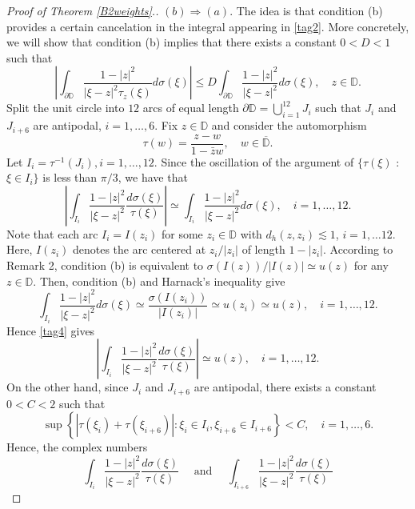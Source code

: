 \documentclass[a4paper,12pt]{article}
\theoremstyle{definition}
\numberwithin{equation}{section}
\newcommand{\D}{\mathbb D}
\begin{document}
\begin{proof}[Proof of Theorem \ref{B2weights}.]
$(b) \Rightarrow(a)$. The idea is that condition (b) provides a certain cancelation in the integral appearing in \eqref{tag2}. More concretely, we will show that condition (b) implies that there exists a constant $0<D<1$ such that
\begin{equation}
    \label{AC1}
    \left|\int_{\partial \D} \frac{1-|z|^{2}}{|\xi-z|^{2} \tau_z (\xi)} d \sigma (\xi)\right| \leq D \int_{\partial \D} \frac{1-|z|^{2}}{|\xi-z|^{2}} d \sigma (\xi), \quad z \in \D  . 
\end{equation}
Split the unit circle into $12$ arcs of equal length $\partial \mathbb{D}=\bigcup_{i=1}^{12} J_{i}$ such that $J_{i}$ and $J_{i+6}$ are antipodal, $i=1, \ldots, 6$. Fix $z \in \mathbb{D}$ and consider the automorphism
$$
\tau (w)=\frac{z-w}{1-\bar{z} w}, \quad  w \in \overline{ \mathbb{D} } . 
$$
Let $I_{i}=\tau^{-1}\left(J_{i}\right), i=1, \ldots, 12$. Since the oscillation of the argument of $\{ \tau(\xi)$ : $\xi \in I_i \}$ is less than $\pi / 3$, we have that 
\begin{equation}
    \label{tag4}
    \left|\int_{I_{i}} \frac{1-|z|^{2}}{|\xi-z|^{2}} \frac{d \sigma(\xi)}{\tau(\xi)}\right| \simeq  \int_{I_{i}} \frac{1-|z|^{2}}{|\xi-z|^{2}} d \sigma ( \xi),\quad  i=1,\ldots , 12. 
\end{equation}
Note that each arc $I_{i} = I(z_i)$ for some $z_{i} \in \D$ with $d_{h}\left(z, z_{i}\right) \lesssim 1$, $i=1, \ldots 12$. Here, $I(z_i)$ denotes the arc centered at $z_i / |z_i|$ of length $1-|z_i|$. According to Remark 2, condition (b) is equivalent to $\sigma (I(z)) / |I(z)| \simeq u(z)$ for any $z \in \D $. Then, condition (b) and Harnack's inequality give 
$$
\int_{I_i} \frac{1-|z|^2}{|\xi - z|^2} d \sigma (\xi) \simeq \frac{\sigma\left(I (z_i)\right)}{| I (z_i)|} \simeq u(z_i) \simeq u(z), \quad i=1,\ldots, 12 .  
$$
Hence \eqref{tag4} gives 
$$
\left|\int_{I_i} \frac{1-|z|^{2}}{|\xi-z|^{2}} \frac{d \sigma(\xi)}{\tau(\xi)}\right| \simeq u (z), \quad i=1, \ldots , 12 .
$$
On the other hand, since $J_{i}$ and $J_{i+6}$ are antipodal, there exists a constant $0<C<2$ such that
$$
\sup \left\{ \left|\tau\left(\xi_{i}\right) + \tau\left(\xi_{i+6}\right)\right|: \xi_{i} \in I_{i}, \xi_{i+6} \in I_{i+6}\right\}<C ,\quad  i=1,\ldots , 6. 
$$
Hence, the complex numbers 
$$
\int_{I_{i}} \frac{1-|z|^{2}}{|\xi-z|^{2}} \frac{d \sigma(\xi)}{\tau(\xi)} \quad  \text { and } \quad  \int_{I_{i+6}} \frac{1-|z|^{2}}{|\xi-z|^{2}} \frac{d\sigma (\xi)}{\tau(\xi)}
$$
\end{proof}
\end{document}
